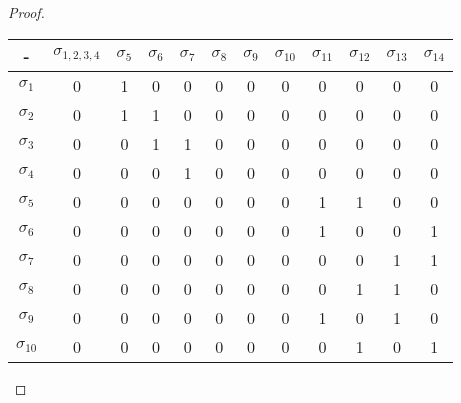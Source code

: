 \begin{proof}
\begin{enumerate}
    \begin{center}
        \begin{tabular}{|c|c|c|c|c|c|c|c|c|c|c|c|}
            \hline
            -             & $\sigma_{1,2,3,4}$ & $\sigma_5$ & $\sigma_6$ & $\sigma_7$ & $\sigma_8$ & $\sigma_9$ & $\sigma_{10}$ & $\sigma_{11}$ & $\sigma_{12}$ & $\sigma_{13}$ & $\sigma_{14}$ \\ \hline
            $\sigma_1$    & 0                  & 1          & 0          & 0          & 0          & 0          & 0             & 0             & 0             & 0             & 0             \\ \hline
            $\sigma_2$    & 0                  & 1          & 1          & 0          & 0          & 0          & 0             & 0             & 0             & 0             & 0             \\ \hline
            $\sigma_3$    & 0                  & 0          & 1          & 1          & 0          & 0          & 0             & 0             & 0             & 0             & 0             \\ \hline
            $\sigma_4$    & 0                  & 0          & 0          & 1          & 0          & 0          & 0             & 0             & 0             & 0             & 0             \\ \hline
            $\sigma_5$    & 0                  & 0          & 0          & 0          & 0          & 0          & 0             & 1             & 1             & 0             & 0             \\ \hline
            $\sigma_6$    & 0                  & 0          & 0          & 0          & 0          & 0          & 0             & 1             & 0             & 0             & 1             \\ \hline
            $\sigma_7$    & 0                  & 0          & 0          & 0          & 0          & 0          & 0             & 0             & 0             & 1             & 1             \\ \hline
            $\sigma_8$    & 0                  & 0          & 0          & 0          & 0          & 0          & 0             & 0             & 1             & 1             & 0             \\ \hline
            $\sigma_9$    & 0                  & 0          & 0          & 0          & 0          & 0          & 0             & 1             & 0             & 1             & 0             \\ \hline
            $\sigma_{10}$ & 0                  & 0          & 0          & 0          & 0          & 0          & 0             & 0             & 1             & 0             & 1             \\ \hline

\end{tabular}
\end{center}
\end{enumerate}
\end{proof}
